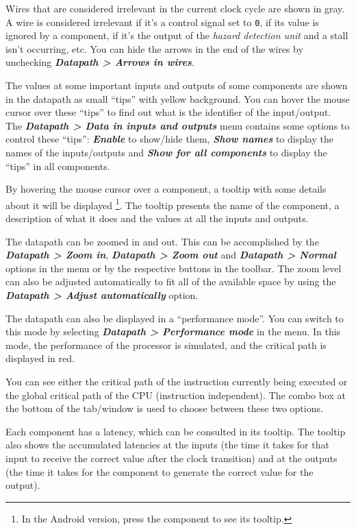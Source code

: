 \documentclass[11pt,a4paper,twoside,titlepage]{report}
\newcommand{\menupath}[1]{\textbf{\emph{#1}}}
\begin{document}
Wires that are considered irrelevant in the current clock cycle are shown
in gray.
A wire is considered irrelevant if it's a control signal set to \verb+0+,
if its value is ignored by a component, if it's the output of the
\emph{hazard detection unit} and a stall isn't occurring, etc.
You can hide the arrows in the end of the wires by unchecking
\menupath{Datapath > Arrows in wires}.

The values at some important inputs and outputs of some components are
shown in the datapath as small ``tips'' with yellow background.
You can hover the mouse cursor over these ``tips'' to find out what
is the identifier of the input/output.
The \menupath{Datapath > Data in inputs and outputs} menu contains some
options to control these ``tips'': \menupath{Enable} to show/hide them,
\menupath{Show names} to display the names of the inputs/outputs and
\menupath{Show for all components} to display the ``tips'' in all components.

By hovering the mouse cursor over a component, a tooltip with some details
about it will be displayed \footnote{In the Android version, press the 
component to see its tooltip.}.
The tooltip presents the name of the component, a description of what it
does and the values at all the inputs and outputs.

The datapath can be zoomed in and out. This can be accomplished by the
\menupath{Datapath > Zoom in}, \menupath{Datapath > Zoom out} and
\menupath{Datapath > Normal} options in the menu or by the respective
buttons in the toolbar.
The zoom level can also be adjusted automatically to fit all of the
available space by using the \menupath{Datapath > Adjust automatically}
option.


\bigskip

The datapath can also be displayed in a ``performance mode''. You can
switch to this mode by selecting \menupath{Datapath > Performance mode}
in the menu.
In this mode, the performance of the processor is simulated, and the
critical path is displayed in red.

You can see either the critical path of the instruction currently being
executed or the global critical path of the CPU (instruction independent).
The combo box at the bottom of the tab/window is used to choose between
these two options.

Each component has a latency, which can be consulted in its tooltip.
The tooltip also shows the accumulated latencies at the inputs (the time it
takes for that input to receive the correct value after the clock transition)
and at the outputs (the time it takes for the component to generate the
correct value for the output).
\end{document}
